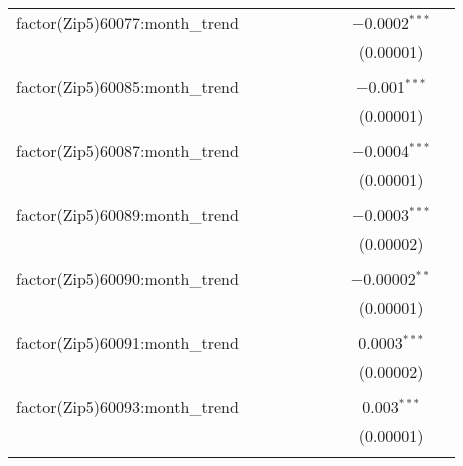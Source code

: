 \begin{table}[H]
{\begin{tabular}{@{\extracolsep{5pt}}lcccccccc}
  factor(Zip5)60077:month\_trend &  &  &  &  &  &  & $-$0.0002$^{***}$ &  \\  

   &  &  &  &  &  &  & (0.00001) &  \\  

   & & & & & & & & \\  

  factor(Zip5)60085:month\_trend &  &  &  &  &  &  & $-$0.001$^{***}$ &  \\  

   &  &  &  &  &  &  & (0.00001) &  \\  

   & & & & & & & & \\  

  factor(Zip5)60087:month\_trend &  &  &  &  &  &  & $-$0.0004$^{***}$ &  \\  

   &  &  &  &  &  &  & (0.00001) &  \\  

   & & & & & & & & \\  

  factor(Zip5)60089:month\_trend &  &  &  &  &  &  & $-$0.0003$^{***}$ &  \\  

   &  &  &  &  &  &  & (0.00002) &  \\  

   & & & & & & & & \\  

  factor(Zip5)60090:month\_trend &  &  &  &  &  &  & $-$0.00002$^{**}$ &  \\  

   &  &  &  &  &  &  & (0.00001) &  \\  

   & & & & & & & & \\  

  factor(Zip5)60091:month\_trend &  &  &  &  &  &  & 0.0003$^{***}$ &  \\  

   &  &  &  &  &  &  & (0.00002) &  \\  

   & & & & & & & & \\  

  factor(Zip5)60093:month\_trend &  &  &  &  &  &  & 0.003$^{***}$ &  \\  

   &  &  &  &  &  &  & (0.00001) &  \\  

   & & & & & & & & \\  


\end{tabular}}
\end{table}
